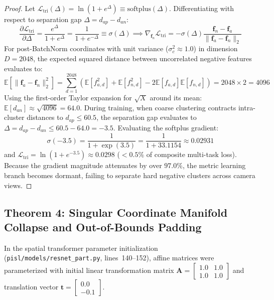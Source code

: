 \begin{proof}
Let $\mathcal{L}_{\text{tri}}(\Delta) = \ln(1 + e^\Delta) \equiv \mathrm{softplus}(\Delta)$. Differentiating with respect to separation gap $\Delta = d_{ap} - d_{an}$:
\begin{equation}
\frac{\partial \mathcal{L}_{\text{tri}}}{\partial \Delta} = \frac{e^\Delta}{1 + e^\Delta} = \frac{1}{1 + e^{-\Delta}} \equiv \sigma(\Delta) \implies \nabla_{\mathbf{f}_n} \mathcal{L}_{\text{tri}} = -\sigma(\Delta) \frac{\mathbf{f}_n - \mathbf{f}_a}{\|\mathbf{f}_a - \mathbf{f}_n\|_2}
\end{equation}
For post-BatchNorm coordinates with unit variance ($\sigma_c^2 \approx 1.0$) in dimension $D = 2048$, the expected squared distance between uncorrelated negative features evaluates to:
\begin{equation}
\mathbb{E}[\|\mathbf{f}_a - \mathbf{f}_n\|_2^2] = \sum_{d=1}^{2048} (\mathbb{E}[f_{a, d}^2] + \mathbb{E}[f_{n, d}^2] - 2\mathbb{E}[f_{a, d}]\mathbb{E}[f_{n, d}]) = 2048 \times 2 = 4096
\end{equation}
Using the first-order Taylor expansion for $\sqrt{X}$ around its mean: $\mathbb{E}[d_{an}] \approx \sqrt{4096} = 64.0$.
During training, when coarse clustering contracts intra-cluster distances to $d_{ap} \le 60.5$, the separation gap evaluates to $\Delta = d_{ap} - d_{an} \le 60.5 - 64.0 = -3.5$. Evaluating the softplus gradient:
\begin{equation}
\sigma(-3.5) = \frac{1}{1 + \exp(3.5)} = \frac{1}{1 + 33.1154} \approx 0.02931
\end{equation}
and $\mathcal{L}_{\text{tri}} = \ln(1 + e^{-3.5}) \approx 0.0298$ ($<0.5\%$ of composite multi-task loss). Because the gradient magnitude attenuates by over $97.0\%$, the metric learning branch becomes dormant, failing to separate hard negative clusters across camera views.
\end{proof}

\subsection{Theorem 4: Singular Coordinate Manifold Collapse and Out-of-Bounds Padding}
\label{subsec:thm4}

In the spatial transformer parameter initialization (\texttt{pisl/models/resnet\_part.py}, lines~140--152), affine matrices were parameterized with initial linear transformation matrix $\mathbf{A} = \begin{bmatrix} 1.0 & 1.0 \\ 1.0 & 1.0 \end{bmatrix}$ and translation vector $\mathbf{t} = \begin{bmatrix} 0.0 \\ -0.1 \end{bmatrix}$.

